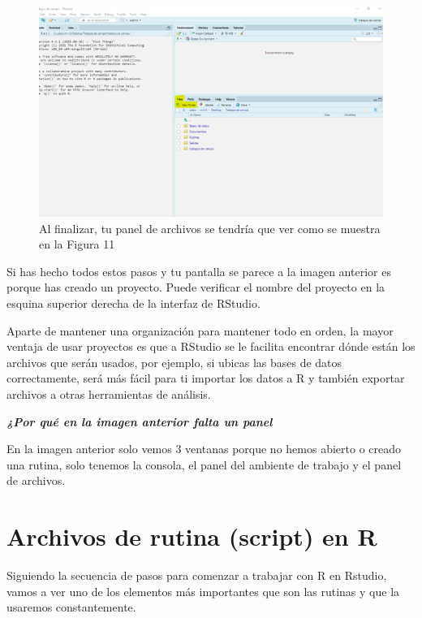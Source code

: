 \documentclass[
  letterpaper,
  DIV=11,
  numbers=noendperiod]{scrreprt}
\begin{document}
\begin{figure}[H]

{\centering \includegraphics[width=6.19in,height=\textheight,keepaspectratio]{imagenes/01rstudiointerfazinicial.png}

}

\caption{Al finalizar, tu panel de archivos se tendría que ver como se
muestra en la Figura 11}

\end{figure}%

Si has hecho todos estos pasos y tu pantalla se parece a la imagen
anterior es porque has creado un proyecto. Puede verificar el nombre del
proyecto en la esquina superior derecha de la interfaz de RStudio.

Aparte de mantener una organización para mantener todo en orden, la
mayor ventaja de usar proyectos es que a RStudio se le facilita
encontrar dónde están los archivos que serán usados, por ejemplo, si
ubicas las bases de datos correctamente, será más fácil para ti importar
los datos a R y también exportar archivos a otras herramientas de
análisis.

\textbf{\emph{¿Por qué en la imagen anterior falta un panel}}

En la imagen anterior solo vemos 3 ventanas porque no hemos abierto o
creado una rutina, solo tenemos la consola, el panel del ambiente de
trabajo y el panel de archivos.

\section{Archivos de rutina (script) en
R}\label{archivos-de-rutina-script-en-r}

Siguiendo la secuencia de pasos para comenzar a trabajar con R en
Rstudio, vamos a ver uno de los elementos más importantes que son las
rutinas y que la usaremos constantemente.
\end{document}
